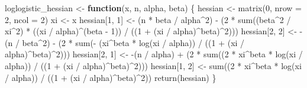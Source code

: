 \documentclass[
]{article}
\newenvironment{Shaded}{\begin{snugshade}}{\end{snugshade}}
\newcommand{\AttributeTok}[1]{\textcolor[rgb]{0.77,0.63,0.00}{#1}}
\newcommand{\ControlFlowTok}[1]{\textcolor[rgb]{0.13,0.29,0.53}{\textbf{#1}}}
\newcommand{\DecValTok}[1]{\textcolor[rgb]{0.00,0.00,0.81}{#1}}
\newcommand{\FunctionTok}[1]{\textcolor[rgb]{0.00,0.00,0.00}{#1}}
\newcommand{\NormalTok}[1]{#1}
\newcommand{\OtherTok}[1]{\textcolor[rgb]{0.56,0.35,0.01}{#1}}
\newcommand{\SpecialCharTok}[1]{\textcolor[rgb]{0.00,0.00,0.00}{#1}}
\begin{document}
\begin{Shaded}
\begin{Highlighting}[]
\NormalTok{loglogistic\_hessian }\OtherTok{\textless{}{-}} \ControlFlowTok{function}\NormalTok{(x, n, alpha, beta) \{}
\NormalTok{  hessian }\OtherTok{\textless{}{-}} \FunctionTok{matrix}\NormalTok{(}\DecValTok{0}\NormalTok{, }\AttributeTok{nrow =} \DecValTok{2}\NormalTok{, }\AttributeTok{ncol =} \DecValTok{2}\NormalTok{)}
\NormalTok{  xi }\OtherTok{\textless{}{-}}\NormalTok{ x}
\NormalTok{  hessian[}\DecValTok{1}\NormalTok{, }\DecValTok{1}\NormalTok{] }\OtherTok{\textless{}{-}}\NormalTok{ (n }\SpecialCharTok{*}\NormalTok{ beta }\SpecialCharTok{/}\NormalTok{ alpha}\SpecialCharTok{\^{}}\DecValTok{2}\NormalTok{) }\SpecialCharTok{{-}}\NormalTok{ (}\DecValTok{2} \SpecialCharTok{*} \FunctionTok{sum}\NormalTok{((beta}\SpecialCharTok{\^{}}\DecValTok{2} \SpecialCharTok{/}\NormalTok{ xi}\SpecialCharTok{\^{}}\DecValTok{2}\NormalTok{) }\SpecialCharTok{*}\NormalTok{ ((xi }\SpecialCharTok{/}\NormalTok{ alpha)}\SpecialCharTok{\^{}}\NormalTok{(beta }\SpecialCharTok{{-}} \DecValTok{1}\NormalTok{)) }\SpecialCharTok{/}\NormalTok{ ((}\DecValTok{1} \SpecialCharTok{+}\NormalTok{ (xi }\SpecialCharTok{/}\NormalTok{ alpha)}\SpecialCharTok{\^{}}\NormalTok{beta)}\SpecialCharTok{\^{}}\DecValTok{2}\NormalTok{)))}
\NormalTok{  hessian[}\DecValTok{2}\NormalTok{, }\DecValTok{2}\NormalTok{] }\OtherTok{\textless{}{-}} \SpecialCharTok{{-}}\NormalTok{(n }\SpecialCharTok{/}\NormalTok{ beta}\SpecialCharTok{\^{}}\DecValTok{2}\NormalTok{) }\SpecialCharTok{{-}}\NormalTok{ (}\DecValTok{2} \SpecialCharTok{*} \FunctionTok{sum}\NormalTok{(}\SpecialCharTok{{-}}\NormalTok{ (xi}\SpecialCharTok{\^{}}\NormalTok{beta }\SpecialCharTok{*} \FunctionTok{log}\NormalTok{(xi }\SpecialCharTok{/}\NormalTok{ alpha)) }\SpecialCharTok{/}\NormalTok{ ((}\DecValTok{1} \SpecialCharTok{+}\NormalTok{ (xi }\SpecialCharTok{/}\NormalTok{ alpha)}\SpecialCharTok{\^{}}\NormalTok{beta)}\SpecialCharTok{\^{}}\DecValTok{2}\NormalTok{)))}
\NormalTok{  hessian[}\DecValTok{2}\NormalTok{, }\DecValTok{1}\NormalTok{] }\OtherTok{\textless{}{-}} \SpecialCharTok{{-}}\NormalTok{(n }\SpecialCharTok{/}\NormalTok{ alpha) }\SpecialCharTok{+}\NormalTok{ (}\DecValTok{2} \SpecialCharTok{*} \FunctionTok{sum}\NormalTok{((}\DecValTok{2} \SpecialCharTok{*}\NormalTok{ xi}\SpecialCharTok{\^{}}\NormalTok{beta }\SpecialCharTok{*} \FunctionTok{log}\NormalTok{(xi }\SpecialCharTok{/}\NormalTok{ alpha)) }\SpecialCharTok{/}\NormalTok{ ((}\DecValTok{1} \SpecialCharTok{+}\NormalTok{ (xi }\SpecialCharTok{/}\NormalTok{ alpha)}\SpecialCharTok{\^{}}\NormalTok{beta)}\SpecialCharTok{\^{}}\DecValTok{2}\NormalTok{)))}
\NormalTok{  hessian[}\DecValTok{1}\NormalTok{, }\DecValTok{2}\NormalTok{] }\OtherTok{\textless{}{-}} \FunctionTok{sum}\NormalTok{((}\DecValTok{2} \SpecialCharTok{*}\NormalTok{ xi}\SpecialCharTok{\^{}}\NormalTok{beta }\SpecialCharTok{*} \FunctionTok{log}\NormalTok{(xi }\SpecialCharTok{/}\NormalTok{ alpha)) }\SpecialCharTok{/}\NormalTok{ ((}\DecValTok{1} \SpecialCharTok{+}\NormalTok{ (xi }\SpecialCharTok{/}\NormalTok{ alpha)}\SpecialCharTok{\^{}}\NormalTok{beta)}\SpecialCharTok{\^{}}\DecValTok{2}\NormalTok{))}
  \FunctionTok{return}\NormalTok{(hessian)}
\NormalTok{\}}



\end{Highlighting}
\end{Shaded}
\end{document}
